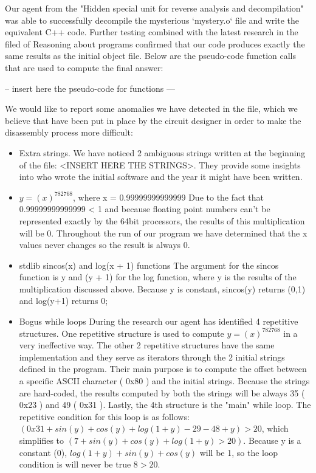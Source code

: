 Our agent from the "Hidden special unit for reverse analysis and decompilation" was able to successfully decompile the mysterious `mystery.o` file and write the equivalent C++ code. Further testing combined with the latest research in the filed of Reasoning about programs confirmed that our code produces exactly the same results as the initial object file. Below are the pseudo-code function calls that are used to compute the final answer:

-- insert here the pseudo-code for functions ---

We would like to report some anomalies we have detected in the file, which we believe that have been put in place by the circuit designer in order to make the disassembly process more difficult:

\begin{itemize}
 \item Extra strings.
 We have noticed 2 ambiguous strings written at the beginning of the file: <INSERT HERE THE STRINGS>. They provide some insights into who wrote the initial software and the year it might have been written. 
 \item $y = (x)^782768$, where x = 0.99999999999999 
 Due to the fact that 0.99999999999999 < 1 and because floating point numbers can't be represented exactly by the 64bit processors, the results of this multiplication will be 0. Throughout the run of our program we have determined that the x values never changes so the result is always 0.
 \item stdlib sincos(x) and log(x + 1) functions
 The argument for the sincos function is y and (y + 1) for the log function, where y is the results of the multiplication discussed above. Because y is constant, sincos(y) returns (0,1) and log(y+1) returns 0;
 \item Bogus while loops
 During the research our agent has identified 4 repetitive structures. One repetitive structure is used to compute $y = (x)^782768$ in a very ineffective way. The other 2 repetitive structures have the same implementation and they serve as iterators through the 2 initial strings defined in the program. Their main purpose is to compute the offset between a specific ASCII character ( 0x80 ) and the initial strings. Because the strings are hard-coded, the results computed by both the strings will be always 35 ( 0x23 ) and 49 ( 0x31 ). 
 Lastly, the 4th structure is the "main" while loop. The repetitive condition for this loop is as follows: $(0x31 + sin(y) + cos(y) + log(1+y) - 29 - 48 + y) > 20$, which simplifies to $(7 + sin(y) + cos(y) + log(1+y) > 20)$. Because y is a constant (0), $log(1+y) + sin(y) + cos(y)$ will be 1, so the loop condition is will never be true $8 > 20$.

\end{itemize}
